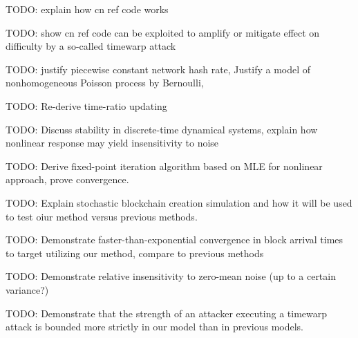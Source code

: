 \documentclass[12pt,english]{mrl}
\theoremstyle{definition}
\numberwithin{equation}{section}
\numberwithin{figure}{section}
\numberwithin{equation}{section}
\numberwithin{equation}{section}
\numberwithin{figure}{section}
\begin{document}

TODO: explain how cn ref code works

TODO: show cn ref code can be exploited to amplify or mitigate effect on difficulty by a so-called timewarp attack


TODO: justify piecewise constant network hash rate, Justify a model of nonhomogeneous Poisson process by Bernoulli, 

TODO: Re-derive time-ratio updating


TODO: Discuss stability in discrete-time dynamical systems, explain how nonlinear response may yield insensitivity to noise

TODO: Derive fixed-point iteration algorithm based on MLE for nonlinear approach, prove convergence.


TODO: Explain stochastic blockchain creation simulation and how it will be used to test oiur method versus previous methods.

TODO: Demonstrate faster-than-exponential convergence in block arrival times to target utilizing our method, compare to previous methods

TODO: Demonstrate relative insensitivity to zero-mean noise (up to a certain variance?)

TODO: Demonstrate that the strength of an attacker executing a timewarp attack is bounded more strictly in our model than in previous models.




\end{document}
